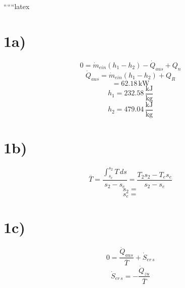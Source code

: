 
``````latex


\section*{1a)}
\begin{equation*}
0 = \dot{m}_{ein} \left( h_1 - h_2 \right) - \dot{Q}_{aus} + Q_n
\end{equation*}
\begin{equation*}
\dot{Q}_{aus} = \dot{m}_{ein} \left( h_1 - h_2 \right) + Q_R
\end{equation*}
\begin{equation*}
= 62.18 \, \text{kW}
\end{equation*}
\begin{equation*}
h_1 = 232.58 \, \frac{\text{kJ}}{\text{kg}}
\end{equation*}
\begin{equation*}
h_2 = 479.04 \, \frac{\text{kJ}}{\text{kg}}
\end{equation*}

\section*{1b)}
\begin{equation*}
\overline{T} = \frac{\int_{s_e}^{s_2} T \, ds}{s_2 - s_e} = \frac{T_2 s_2 - T_e s_e}{s_2 - s_e}
\end{equation*}
\begin{equation*}
s_2 = 
\end{equation*}
\begin{equation*}
s_e = 
\end{equation*}

\section*{1c)}
\begin{equation*}
0 = \frac{\dot{Q}_{aus}}{\overline{T}} + \dot{S}_{er \, s}
\end{equation*}
\begin{equation*}
\dot{S}_{er \, s} = - \frac{\dot{Q}_{zu}}{\overline{T}}
\end{equation*}

